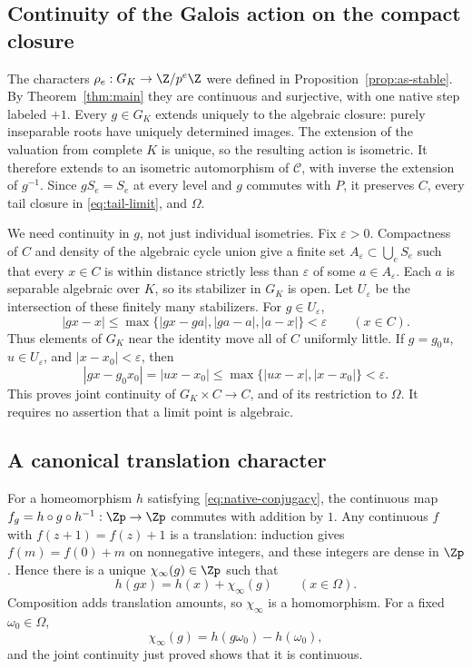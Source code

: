 \subsection{Continuity of the Galois action on the compact closure}

The characters
\(\rho_e:G_K\to\Z/p^e\Z\) were defined in
Proposition~\ref{prop:as-stable}. By Theorem~\ref{thm:main}
they are continuous and surjective, with one native step
labeled \(+1\).
Every \(g\in G_K\) extends uniquely to the algebraic closure:
purely inseparable roots have uniquely determined images.
The extension of the valuation from complete \(K\) is unique,
so the resulting action is isometric. It therefore extends
to an isometric automorphism of \(\mathcal C\), with inverse
the extension of \(g^{-1}\).
Since \(gS_e=S_e\) at every level and \(g\) commutes with \(P\),
it preserves \(C\), every tail closure in \eqref{eq:tail-limit},
and \(\Omega\).

We need continuity in \(g\), not just individual isometries.
Fix \(\varepsilon>0\).
Compactness of \(C\) and density of the algebraic cycle union
give a finite set \(A_\varepsilon\subset\bigcup_e S_e\) such that
every \(x\in C\) is within distance strictly less than
\(\varepsilon\) of some \(a\in A_\varepsilon\).
Each \(a\) is separable algebraic over \(K\), so its stabilizer
in \(G_K\) is open. Let \(U_\varepsilon\) be the intersection
of these finitely many stabilizers. For \(g\in U_\varepsilon\),
\[
 |gx-x|\le
 \max\{|gx-ga|,|ga-a|,|a-x|\}<\varepsilon
 \qquad(x\in C).
\]
Thus elements of \(G_K\) near the identity move all of \(C\)
uniformly little. If \(g=g_0u\), \(u\in U_\varepsilon\), and
\(|x-x_0|<\varepsilon\), then
\[
 |gx-g_0x_0|=|ux-x_0|
 \le\max\{|ux-x|,|x-x_0|\}<\varepsilon.
\]
This proves joint continuity of \(G_K\times C\to C\), and
of its restriction to \(\Omega\).
It requires no assertion that a limit point is algebraic.

\subsection{A canonical translation character}

For a homeomorphism \(h\) satisfying \eqref{eq:native-conjugacy},
the continuous map \(f_g=h\circ g\circ h^{-1}:\Zp\to\Zp\)
commutes with addition by \(1\).
Any continuous \(f\) with \(f(z+1)=f(z)+1\) is a translation:
induction gives \(f(m)=f(0)+m\) on nonnegative integers,
and these integers are dense in \(\Zp\).
Hence there is a unique \(\chi_\infty(g)\in\Zp\) such that
\begin{equation}\label{eq:translation-character}
 h(gx)=h(x)+\chi_\infty(g)\qquad(x\in\Omega).
\end{equation}
Composition adds translation amounts, so \(\chi_\infty\)
is a homomorphism.
For a fixed \(\omega_0\in\Omega\),
\[
 \chi_\infty(g)=h(g\omega_0)-h(\omega_0),
\]
and the joint continuity just proved shows that it is continuous.

